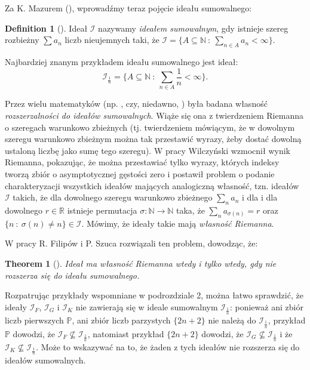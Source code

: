\documentclass{amsart}
\newtheorem{thm}{Theorem}
\theoremstyle{definition}
\newtheorem{problem}{Problem}
\newtheorem{df}{Definition}
\theoremstyle{definition}
\newcommand{\N}{{\mathbb N}}
\newcommand{\R}{{\mathbb R}}
\newcommand{\I}{\mathcal I}
\begin{document}

Za K. Mazurem (\cite{Maz}), wprowadźmy teraz pojęcie ideału sumowalnego:
\begin{df}[\cite{Maz}]
Ideał $\I$ nazywamy \emph{ideałem sumowalnym}, gdy istnieje szereg rozbieżny $\sum{a_n}$ liczb nieujemnych taki, że $\I=\{A\subseteq \N\ :\ \sum_{n\in A} a_n <\infty\}$.
\end{df}
Najbardziej znanym przykładem ideału sumowalnego jest ideał: 
$$\I_{\frac{1}{n}} = \{A\subseteq \N\ :\ \sum_{n\in A} \frac{1}{n} <\infty\}.$$

Przez wielu matematyków (np. \cite{Au}, \cite{FreedSem} czy, niedawno, \cite{Klinga}) była badana własność \emph{rozszerzalności do ideałów sumowalnych}. Wiąże się ona z twierdzeniem Riemanna o szeregach warunkowo zbieżnych (tj. twierdzeniem mówiącym, że w dowolnym szeregu warunkowo zbieżnym można tak przestawić wyrazy, żeby dostać dowolną ustaloną liczbę jako sumę tego szeregu). W pracy \cite{W} Wilczyński wzmocnił wynik Riemanna, pokazując, że można przestawiać tylko wyrazy, których indeksy tworzą zbiór o asymptotycznej gęstości zero i postawił problem o podanie charakteryzacji wszystkich ideałów mających analogiczną własność, tzn. ideałów $\I$ takich, że dla dowolnego szeregu warunkowo zbieżnego $\sum_n a_n$ i dla i dla dowolnego $r\in\R$ istnieje permutacja $\sigma \colon \N\to\N$ taka, że $\sum_n a_{\sigma(n)} = r$ oraz $\{n\ :\ \sigma(n)\neq n\}\in\I$. Mówimy, że ideały takie mają \emph{własność Riemanna}.

W pracy \cite{H3} R. Filipów i P. Szuca rozwiązali ten problem, dowodząc, że:
\begin{thm}[\cite{H3}]
Ideał ma własność Riemanna wtedy i tylko wtedy, gdy nie rozszerza się do ideału sumowalnego.
\end{thm}

Rozpatrując przykłady wspomniane w podrozdziale 2, można łatwo sprawdzić, że ideały $\I_F$, $\I_G$ i $\I_K$ nie zawierają się w ideale sumowalnym $\I_{\frac{1}{n}}$: ponieważ ani zbiór liczb pierwszych $\mathbb{P}$, ani zbiór liczb parzystych $\{2n+2\}$ nie należą do $\I_{\frac{1}{n}}$, przykład $\mathbb{P}$ dowodzi, że $\I_F \nsubseteq \I_{\frac{1}{n}}$, natomiast przykład $\{2n+2\}$ dowodzi, że $\I_G \nsubseteq \I_{\frac{1}{n}}$ i że $\I_K \nsubseteq \I_{\frac{1}{n}}$. Może to wskazywać na to, że żaden z tych ideałów nie rozszerza się do ideałów sumowalnych.
\end{document}
